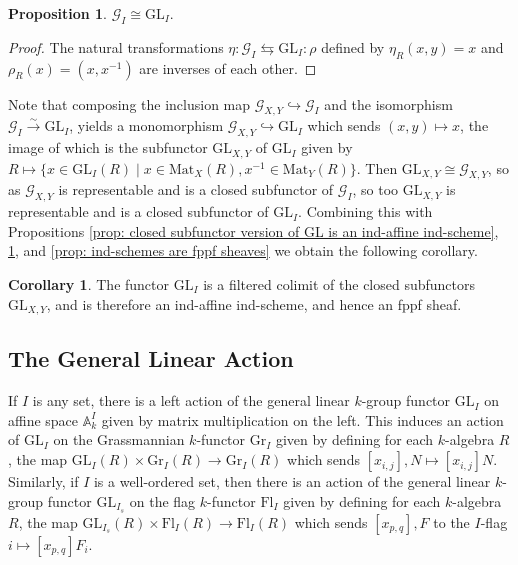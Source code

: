 \documentclass[oneside,11pt]{amsart}
\newcommand{\aaa}{\ensuremath{\mathbb{A}}}
\newcommand{\mG}{\ensuremath{\mathcal{G}}}
\newcommand{\Mat}{\ensuremath{\text{Mat}}}
\newcommand{\GL}{\ensuremath{\text{GL}}}
\newcommand{\Fl}{\ensuremath{\text{Fl}}}
\newcommand{\Gr}{\ensuremath{\text{Gr}}}
\theoremstyle{definition}
\newtheorem{proof techniques}{Proof Techniques}
\newtheorem{corollary}{Corollary}
\newtheorem{proposition}{Proposition}
\begin{document}


\begin{proposition}\label{prop: closed subfunctor version of GL is isomorphic to GL}
$\mG_I \cong \GL_I$. 
\end{proposition}

\begin{proof}
The natural transformations $\eta : \mG_I \leftrightarrows \GL_I : \rho$ defined by $\eta_R ( x , y) = x$ and $\rho_R(x) = (x , x^{-1})$ are inverses of each other. 
\end{proof}

Note that composing the inclusion map $\mG_{X , Y} \hookrightarrow \mG_I$ and the isomorphism $\mG_I \overset{\sim}{\to} \GL_I$, yields a monomorphism $\mG_{X , Y} \hookrightarrow \GL_I$ which sends $(x , y) \mapsto x$, the image of which is the subfunctor $\GL_{X , Y}$ of $\GL_I$ given by $R \mapsto \{ x \in \GL_I(R) \mid x \in \Mat_X(R) , x^{-1} \in \Mat_Y(R) \}$. Then $\GL_{X , Y} \cong \mG_{X ,Y}$, so as $\mG_{X, Y}$ is representable and is a closed subfunctor of $\mG_I$, so too $\GL_{X,Y}$ is representable and is a closed subfunctor of $\GL_I$. Combining this with Propositions \ref{prop: closed subfunctor version of GL is an ind-affine ind-scheme}, \ref{prop: closed subfunctor version of GL is isomorphic to GL}, and \ref{prop: ind-schemes are fppf sheaves} we obtain the following corollary.

\begin{corollary}
The functor $\GL_I$ is a filtered colimit of the closed subfunctors $\GL_{X , Y}$, and is therefore an ind-affine ind-scheme, and hence an fppf sheaf. 
\end{corollary}



\subsection{The General Linear Action} 

If $I$ is any set, there is a left action of the general linear $k$-group functor $\GL_I$ on affine space $\aaa_k^I$ given by matrix multiplication on the left. This induces an action of $\GL_I$ on the Grassmannian $k$-functor $\Gr_I$ given by defining for each $k$-algebra $R$, the map $\GL_I(R) \times \Gr_I(R) \to \Gr_I(R)$ which sends $[x_{i , j}] , N \mapsto [x_{i , j}] N$. Similarly, if $I$ is a well-ordered set, then there is an action of the general linear $k$-group functor $\GL_{I_s}$ on the flag $k$-functor $\Fl_I$ given by defining for each $k$-algebra $R$, the map $\GL_{I_s}(R) \times \Fl_I(R) \to \Fl_I(R)$ which sends $[x_{p , q}] , F$ to the $I$-flag $i \mapsto [x_{p , q}] F_i$. 
\end{document}
